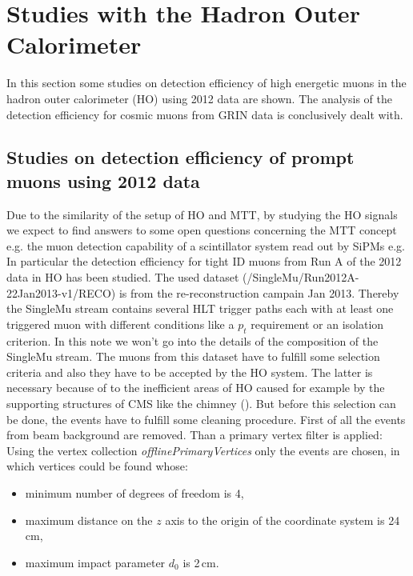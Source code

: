 \section{Studies with the Hadron Outer Calorimeter}
	In this section some studies on detection efficiency of high energetic muons in the hadron outer calorimeter (HO) using 2012 data are shown.
	The analysis of the detection efficiency for cosmic muons from GRIN data is conclusively dealt with.
	\subsection{Studies on detection efficiency of prompt muons using 2012 data}
		Due to the similarity of the setup of HO and MTT, by studying the HO signals we expect to find answers to some open questions concerning the MTT concept e.g. the muon detection capability of a
		scintillator system read out by SiPMs e.g.
		In particular the detection efficiency for tight ID muons from Run A of the 2012 data in HO has been studied.
		The used dataset (/SingleMu/Run2012A-22Jan2013-v1/RECO) is from the re-reconstruction campain Jan 2013.
		Thereby the SingleMu stream contains several HLT trigger paths each with at least one triggered muon with different conditions like a $p_t$ requirement or an isolation criterion.
		In this note we won't go into the details of the composition of the SingleMu stream. 
		The muons from this dataset have to fulfill some selection criteria and also they have to be accepted by the HO system.
		The latter is necessary because of to the inefficient areas of HO caused for example by the supporting structures of CMS like the chimney (\cite{JINST}).
		But before this selection can be done, the events have to fulfill some cleaning procedure.
		First of all the events from beam background are removed.
		Than a primary vertex filter is applied:
		Using the vertex collection \textit{offlinePrimaryVertices} only the events are chosen, in which vertices could be found whose:
			\begin{itemize}
				\item minimum number of degrees of freedom is 4,
				\item maximum distance on the $z$ axis to the origin of the coordinate system is 24\,cm,
				\item maximum impact parameter $d_0$ is 2\,cm.
			\end{itemize}
